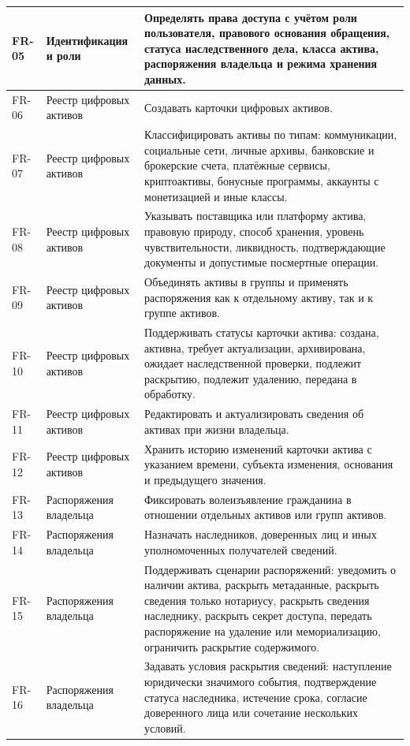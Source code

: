\begin{longtable}{|P{1.45cm}|P{3.35cm}|P{10.7cm}|}
FR-05 & Идентификация и роли & Определять права доступа с учётом роли пользователя, правового основания обращения, статуса наследственного дела, класса актива, распоряжения владельца и режима хранения данных.\\ \hline
FR-06 & Реестр цифровых активов & Создавать карточки цифровых активов.\\ \hline
FR-07 & Реестр цифровых активов & Классифицировать активы по типам: коммуникации, социальные сети, личные архивы, банковские и брокерские счета, платёжные сервисы, криптоактивы, бонусные программы, аккаунты с монетизацией и иные классы.\\ \hline
FR-08 & Реестр цифровых активов & Указывать поставщика или платформу актива, правовую природу, способ хранения, уровень чувствительности, ликвидность, подтверждающие документы и допустимые посмертные операции.\\ \hline
FR-09 & Реестр цифровых активов & Объединять активы в группы и применять распоряжения как к отдельному активу, так и к группе активов.\\ \hline
FR-10 & Реестр цифровых активов & Поддерживать статусы карточки актива: создана, активна, требует актуализации, архивирована, ожидает наследственной проверки, подлежит раскрытию, подлежит удалению, передана в обработку.\\ \hline
FR-11 & Реестр цифровых активов & Редактировать и актуализировать сведения об активах при жизни владельца.\\ \hline
FR-12 & Реестр цифровых активов & Хранить историю изменений карточки актива с указанием времени, субъекта изменения, основания и предыдущего значения.\\ \hline
FR-13 & Распоряжения владельца & Фиксировать волеизъявление гражданина в отношении отдельных активов или групп активов.\\ \hline
FR-14 & Распоряжения владельца & Назначать наследников, доверенных лиц и иных уполномоченных получателей сведений.\\ \hline
FR-15 & Распоряжения владельца & Поддерживать сценарии распоряжений: уведомить о наличии актива, раскрыть метаданные, раскрыть сведения только нотариусу, раскрыть сведения наследнику, раскрыть секрет доступа, передать распоряжение на удаление или мемориализацию, ограничить раскрытие содержимого.\\ \hline
FR-16 & Распоряжения владельца & Задавать условия раскрытия сведений: наступление юридически значимого события, подтверждение статуса наследника, истечение срока, согласие доверенного лица или сочетание нескольких условий.\\ \hline

\end{longtable}
